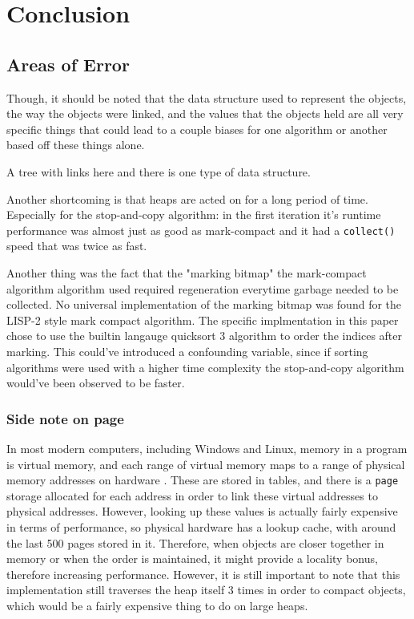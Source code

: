 \documentclass[index]{subfiles}
\begin{document}
\section{Conclusion}
\subsection{Areas of Error}

Though, it should be noted that the data structure used to represent the objects, the way the objects were linked, and the values that the objects held are all very specific things that could lead to a couple biases for one algorithm or another based off these things alone.

A tree with links here and there is one type of data structure.

Another shortcoming is that heaps are acted on for a long period of time. Especially for the stop-and-copy algorithm: in the first iteration it's runtime performance was almost just as good as mark-compact and it had a \verb+collect()+ speed that was twice as fast.

Another thing was the fact that the "marking bitmap" the mark-compact algorithm algorithm used required regeneration everytime garbage needed to be collected. No universal implementation of the marking bitmap was found for the LISP-2 style mark compact algorithm. The specific implmentation in this paper chose to use the builtin langauge quicksort 3 algorithm to order the indices after marking. This could've introduced a confounding variable, since if sorting algorithms were used with a higher time complexity the stop-and-copy algorithm would've been observed to be faster.

\subsubsection{Side note on page}

In most modern computers, including Windows and Linux, memory in a program is virtual memory, and each range of virtual memory maps to a range of physical memory addresses on hardware \cite{code_project}. These are stored in tables, and there is a \verb+page+ storage allocated for each address in order to link these virtual addresses to physical addresses. However, looking up these values is actually fairly expensive in terms of performance, so physical hardware has a lookup cache, with around the last 500 pages stored in it. Therefore, when objects are closer together in memory or when the order is maintained, it might provide a locality bonus, therefore increasing performance. However, it is still important to note that this implementation still traverses the heap itself 3 times in order to compact objects, which would be a fairly expensive thing to do on large heaps.
\end{document}
